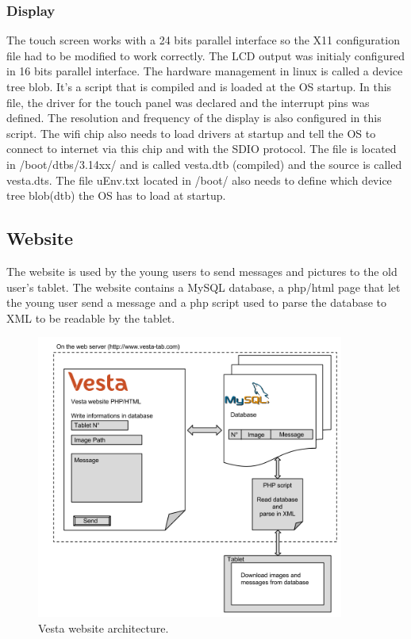 \subsubsection{Display}
The touch screen works with a 24 bits parallel interface so the X11 configuration file had to be modified to work correctly. The LCD output was initialy configured in 16 bits parallel interface.
The hardware management in linux is called a device tree blob. It’s a script that is compiled and is loaded at the OS startup. In this file, the driver for the touch panel was declared and the interrupt pins was defined. The resolution and frequency of the display is also configured in this script. The wifi chip also needs to load drivers at startup and tell the OS to connect to internet via this chip and with the SDIO protocol.
The file is located in /boot/dtbs/3.14xx/ and is called vesta.dtb (compiled) and the source is called vesta.dts. The file uEnv.txt located in /boot/ also needs to define which device tree blob(dtb) the OS has to load at startup.


\subsection{Website}

The website is used by the young users to send messages and pictures to the old user’s tablet.
The website contains a MySQL database, a php/html page that let the young user send a message and a php script used to parse the database to XML to be readable by the tablet.

\begin{figure}[!htb]
    \centering
    \includegraphics[width=0.9\textwidth,keepaspectratio]{chap/softFig/vesta_website2}
    \caption{Vesta website architecture.}
    \label{fig:web archi}
\end{figure}

